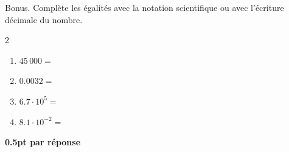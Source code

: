 
\bonusquestion[2]
\textcolor{themeColor}{Bonus.} Complète les égalités avec la notation scientifique ou avec l'écriture décimale du nombre.

\vspace{10pt}
\setlength{\columnsep}{50pt}
\begin{multicols}{2}
\begin{enumerate}[leftmargin=*,align=parleft, label=\alph*), itemsep=30pt]
\item $45\,000 =$ 
\item $0.0032 =$ 
\item $6.7 \cdot 10^{5} =$ 
\item $8.1 \cdot 10^{-2} =$ 
\end{enumerate}
\end{multicols}
\setlength{\columnsep}{10pt}

\begin{solution}[0pt]
\textbf{0.5pt par réponse}
\end{solution}